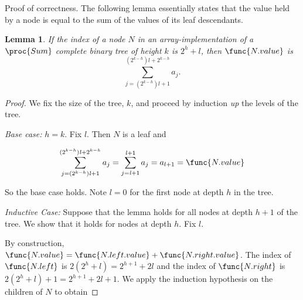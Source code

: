 \documentclass[11pt, answers]{exam}
\theoremstyle{plain}
\newtheorem{lemma}{Lemma}
\theoremstyle{definition}
\begin{document}
\begin{questions}
\begin{parts}
\begin{solution}
\begin{minipage}[t]{\linewidth}


\end{minipage}




Proof of correctness.
The following lemma essentially states that the value held by a node is equal to the sum of the values of its leaf descendants.
\begin{lemma}
If the index of a node $N$ in an array-implementation of a $\proc{Sum}$ complete binary tree of height $k$ is $2^h + \mathit{l}$, then $\func{N.value}$ is \[\sum_{j = (2^{k-h})\mathit{l} + 1}^{(2^{k-h})\mathit{l} + 2^{k-h}}a_j.\]
\end{lemma}
\begin{proof}
We fix the size of the tree, $k$, and proceed by induction \emph{up} the levels of the tree. 

\emph{Base case:} $h = k$. Fix $\mathit{l}$. Then $N$ is a leaf and 

\begin{gather*}
\sum_{j = (2^{k-h})\mathit{l} + 1}^{(2^{k-h})\mathit{l} + 2^{k-h}}a_j 
 = \sum_{j = \mathit{l} + 1}^{\mathit{l} + 1}a_j
 = a_{l + 1} = \func{N.value}
\end{gather*}

So the base case holds. Note $\mathit{l} = 0$ for the first node at depth $h$ in the tree.

\emph{Inductive Case:} Suppose that the lemma holds for all nodes at depth $h + 1$ of the tree. We show that it holds for nodes at depth $h$. Fix $\mathit{l}$.

By construction, $\func{N.value} = \func{N.left.value} + \func{N.right.value}$. The index of $\func{N.left}$ is $2(2^h + \mathit{l}) = 2^{h+1} + 2\mathit{l}$ and the index of $\func{N.right}$ is $2(2^h + \mathit{l}) + 1 = 2^{h+1} + 2\mathit{l} + 1$. We apply the induction hypothesis on the children of $N$ to obtain


\end{proof}
\end{solution}
\end{parts}
\end{questions}
\end{document}
